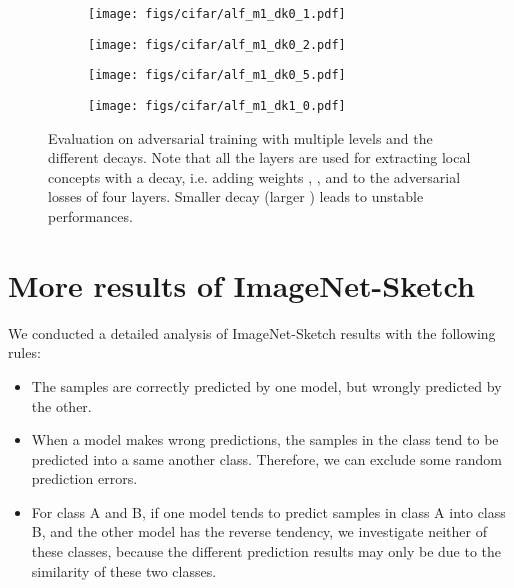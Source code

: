 \documentclass{article}
\begin{document}
\begin{figure}[h!]
  \centering
    \begin{subfigure}{.49\textwidth}
      \centering
      \texttt{[image: figs/cifar/alf\_m1\_dk0\_1.pdf]}
      \caption{}
      \label{process}
    \end{subfigure}
    \begin{subfigure}{.49\textwidth}
      \centering
      \texttt{[image: figs/cifar/alf\_m1\_dk0\_2.pdf]}
      \caption{}
    \end{subfigure}
    \begin{subfigure}{.49\textwidth}
      \centering
      \texttt{[image: figs/cifar/alf\_m1\_dk0\_5.pdf]}
      \caption{}
    \end{subfigure}
    \begin{subfigure}{.49\textwidth}
      \centering
      \texttt{[image: figs/cifar/alf\_m1\_dk1\_0.pdf]}
      \caption{}
    \end{subfigure}
\caption{Evaluation on adversarial training with multiple levels and the different decays. Note that all the layers are used for extracting local concepts with a decay, i.e. adding weights , ,  and  to the adversarial losses of four layers. Smaller decay (larger ) leads to unstable performances.}
\label{fig:multilayer}
\end{figure}

\newpage 

\section{More results of ImageNet-Sketch}
\label{sec:appendix:sketch}

We conducted a detailed analysis of ImageNet-Sketch results with the following rules: 
\begin{itemize}
    \item The samples are correctly predicted by one model, but wrongly predicted by the other. 
    \item When a model makes wrong predictions, the samples in the class tend to be predicted into a same another class. Therefore, we can exclude some random prediction errors. 
    \item For class A and B, if one model tends to predict samples in class A into class B, and the other model has the reverse tendency, we investigate neither of these classes, because the different prediction results may only be due to the similarity of these two classes. 
\end{itemize}
\end{document}
